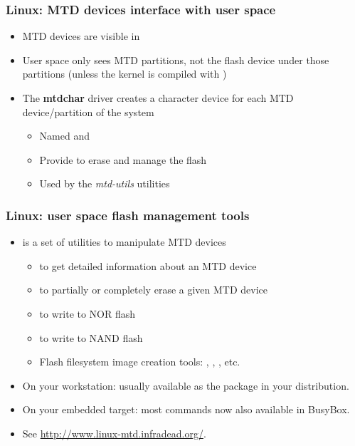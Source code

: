 \begin{frame}
  \frametitle{Linux: MTD devices interface with user space}
  \begin{itemize}
  \item MTD devices are visible in 
  \item User space only sees MTD partitions, not the flash device
    under those partitions (unless the kernel is compiled with
    )
  \item The {\bf mtdchar} driver creates a character device for each
    MTD device/partition of the system
    \begin{itemize}
    \item Named  and 
    \item Provide  to erase and manage the flash
    \item Used by the {\em mtd-utils} utilities
    \end{itemize}
  \end{itemize}
\end{frame}

\begin{frame}
  \frametitle{Linux: user space flash management tools}
  \begin{itemize}
  \item {} is a set of utilities to manipulate MTD devices
    \begin{itemize}
    \item {} to get detailed information about an MTD device
    \item {} to partially or completely erase a given
      MTD device
    \item {} to write to NOR flash
    \item {} to write to NAND flash
    \item Flash filesystem image creation tools: ,
      , , etc.
    \end{itemize}
  \item On your workstation: usually available as the 
      package in your distribution.
  \item On your embedded target: most commands now also available
      in BusyBox.
  \item See \url{http://www.linux-mtd.infradead.org/}.
  \end{itemize}
\end{frame}


